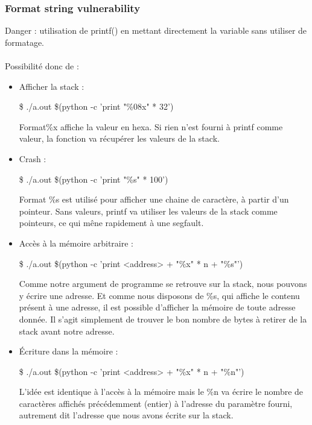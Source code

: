 \documentclass[a4paper]{article}
\begin{document}
\subsubsection{Format string vulnerability}
Danger : utilisation de printf() en mettant directement la variable sans utiliser de formatage.\\\\ Possibilité donc de :
\begin{itemize}[label = $\hookrightarrow$, font = \Large]
    \item Afficher la stack :\\
    \begin{example}
    \$ ./a.out \$(python -c 'print "\%08x" * 32')
    \end{example}
    Format\%x affiche la valeur en hexa. Si rien n'est fourni à printf comme valeur, la fonction va récupérer les valeurs de la stack.
    \item Crash :\\
    \begin{example}
    \$ ./a.out \$(python -c 'print "\%s" * 100')
    \end{example}
    Format \%s est utilisé pour afficher une chaine de caractère, à partir d’un
    pointeur. Sans valeurs, printf va utiliser les valeurs de la stack
    comme pointeurs, ce qui mêne rapidement à une segfault.
    \item Accès à la mémoire arbitraire :\\
    \begin{example}
    \$ ./a.out \$(python -c 'print <address> + "\%x" * n + "\%s"')
    \end{example}
    Comme notre argument de programme se retrouve sur la stack, nous
    pouvons y écrire une adresse. Et comme nous disposons de \%s, qui
    affiche le contenu présent à une adresse, il est possible d’afficher la
    mémoire de toute adresse donnée. Il s’agit simplement de trouver le
    bon nombre de bytes à retirer de la stack avant notre adresse.
    \item Écriture dans la mémoire :\\
    \begin{example}
    \$ ./a.out \$(python -c 'print <address> + "\%x" * n + "\%n"')
    \end{example}
    L’idée est identique à l’accès à la mémoire mais le \%n va écrire le
    nombre de caractères affichés précédemment (entier) à l’adresse du
    paramètre fourni, autrement dit l’adresse que nous avons écrite sur
    la stack.
\end{itemize}
\end{document}

